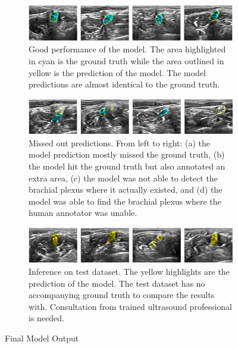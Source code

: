 \documentclass{article}
\begin{document}
\begin{figure}[ht]
    \centering
    \begin{subfigure}[b]{1.0\linewidth}
        \includegraphics[width=1.0\linewidth]{figures/result_1.png}
        \caption{Good performance of the model. The area highlighted in cyan is the ground truth while the area outlined in yellow is the prediction of the model. The model predictions are almost identical to the ground truth.}
        \label{fig:result_1}
    \end{subfigure}
    
    \begin{subfigure}[b]{1.0\linewidth}
        \includegraphics[width=1.0\linewidth]{figures/result_2.png}
        \caption{Missed out predictions. From left to right: (a) the model prediction mostly missed the ground truth, (b) the model hit the ground truth but also annotated an extra area, (c) the model was not able to detect the brachial plexus where it actually existed, and (d) the model was able to find the brachial plexus where the human annotator was unable.}
        \label{fig:result_2}
    \end{subfigure}
    
    \begin{subfigure}[b]{1.0\linewidth}
        \includegraphics[width=1.0\linewidth]{figures/result_3.png}
        \caption{Inference on test dataset. The yellow highlights are the prediction of the model. The test dataset has no accompanying ground truth to compare the results with. Consultation from trained ultrasound professional is needed.}
        \label{fig:result_3}
    \end{subfigure}


    \caption{Final Model Output}
    \label{fig:result}
\end{figure}


\bigskip


\bigskip


\bigskip




\end{document}
